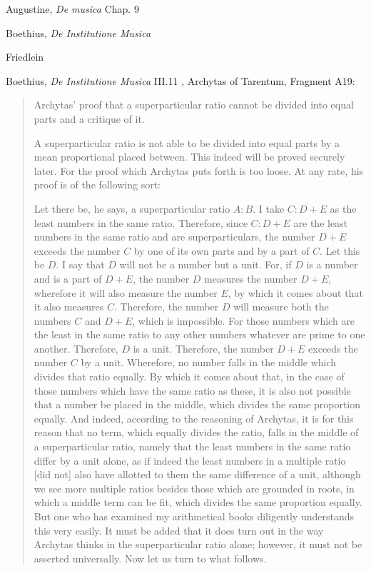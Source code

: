 \documentclass{amsart}
\theoremstyle{definition}
\begin{document}
Augustine, {\em De musica} Chap. 9 \cite{taliaferro}

Boethius, {\em De Institutione Musica} \cite{bower}

Friedlein \cite{friedlein}

Boethius, {\em De Institutione Musica} III.11 \cite[pp.~451--470]{archytas}, Archytas of Tarentum, Fragment A19: 

\begin{quote}
Archytas' proof that a superparticular ratio cannot be divided into equal parts and a critique of it.

A superparticular ratio is not able to be divided into equal parts by a mean proportional placed between. This indeed will be proved securely later. For the proof which Archytas puts forth is too loose. At any rate, his proof is of the following sort:

Let there be, he says, a superparticular ratio $A:B$. I take $C:D + E$ as the least numbers in the same ratio. Therefore, since $C:D + E$ are the least numbers
in the same ratio and are superparticulars, the number $D + E$ exceeds the number $C$ by one of its own parts and by a part of $C$. Let this be $D$. I say that $D$ will not be a number but a unit. For, if $D$ is a number and is a part of $D + E$, the number $D$ measures the number $D + E$, wherefore it will also measure the number $E$, by which it comes about that it also measures $C$. Therefore, the number $D$ will measure both the numbers $C$ and $D + E$, which is impossible. For those numbers which are the least in the same ratio to any other numbers whatever are prime to one another. Therefore, $D$ is a unit. Therefore, the number $D + E$ exceeds the number $C$ by a unit. Wherefore, no number falls in the middle which divides that ratio equally. By which it comes about that, in the case of those numbers which have the same ratio as these, it is also not possible that a number be placed in the middle, which divides the same proportion equally.
And indeed, according to the reasoning of Archytas, it is for this reason that no term, which equally divides the ratio, falls in the middle of a superparticular ratio, namely that the least numbers in the same ratio differ by a unit alone, as if indeed the least numbers in a multiple ratio [did not] also have allotted to them the same difference of a unit, although we see more multiple ratios besides those which are grounded in roots, in which a middle term can be fit, which divides the same proportion equally. But one who has examined my arithmetical books diligently understands this very easily. It must be added that it does turn out in the way Archytas thinks in the superparticular ratio alone; however, it must not be asserted universally. Now let us turn to what follows.
\end{quote}
\end{document}

